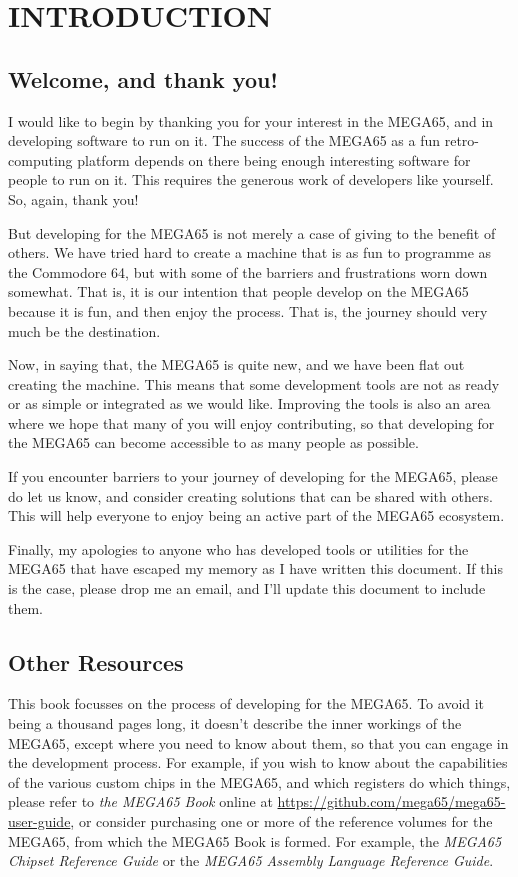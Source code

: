 \part{INTRODUCTION}

\chapter{Welcome, and thank you!}

I would like to begin by thanking you for your interest in the MEGA65,
and in developing software to run on it. The success of the MEGA65 as
a fun retro-computing platform depends on there being enough
interesting software for people to run on it.  This requires the
generous work of developers like yourself. So, again, thank you!

But developing for the MEGA65 is not merely a case of giving to the
benefit of others. We have tried hard to create a machine that is as
fun to programme as the Commodore 64, but with some of the barriers
and frustrations worn down somewhat.  That is, it is our intention
that people develop on the MEGA65 because it is fun, and then enjoy
the process.  That is, the journey should very much be the
destination.

Now, in saying that, the MEGA65 is quite new, and we have been flat
out creating the machine. This means that some development tools are
not as ready or as simple or integrated as we would like.  Improving
the tools is also an area where we hope that many of you will enjoy
contributing, so that developing for the MEGA65 can become accessible
to as many people as possible.

If you encounter barriers to your
journey of developing for the MEGA65, please do let us know, and
consider creating solutions that can be shared with others.  This will
help everyone to enjoy being an active part of the MEGA65 ecosystem.

Finally, my apologies to anyone who has developed tools or utilities
for the MEGA65 that have escaped my memory as I have written this
document.  If this is the case, please drop me an email, and I'll
update this document to include them.

\chapter{Other Resources}

This book focusses on the process of developing for the MEGA65.  To
avoid it being a thousand pages long, it doesn't describe the inner
workings of the MEGA65, except where you need to know about them, so
that you can engage in the development process.  For example, if you
wish to know about the capabilities of the various custom chips in the
MEGA65, and which registers do which things, please refer to {\em the
MEGA65 Book} online
at \url{https://github.com/mega65/mega65-user-guide}, or consider
purchasing one or more of the reference volumes for the MEGA65, from
which the MEGA65 Book is formed.  For example, the {\em MEGA65 Chipset
Reference Guide} or the {\em MEGA65 Assembly Language Reference Guide}.

